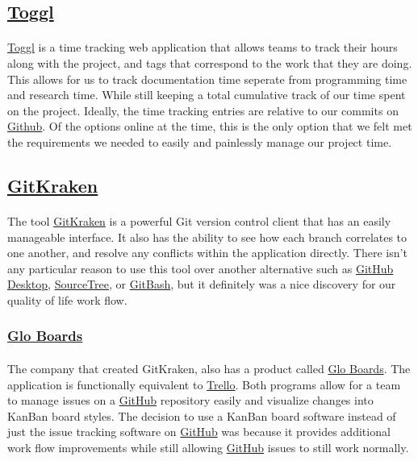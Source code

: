 \documentclass[12pt]{article}
\begin{document}
\subsection{\href{https://toggl.com}{Toggl}}
\paragraph{}	\href{https://toggl.com}{Toggl} is a time tracking web application that allows teams to track their hours along with the project, and tags that correspond to the work that they are doing. This allows for us to track documentation time seperate from programming time and research time. While still keeping a total cumulative track of our time spent on the project. Ideally, the time tracking entries are relative to our commits on \href{https://Github.com}{Github}. Of the options online at the time, this is the only option that we felt met the requirements we needed to easily and painlessly manage our project time.

\subsection{\href{https://www.gitkraken.com/}{GitKraken}}
\paragraph{}	The tool \href{https://www.gitkraken.com/}{GitKraken} is a powerful Git version control client that has an easily manageable interface. It also has the ability to see how each branch correlates to one another, and resolve any conflicts within the application directly. There isn't any particular reason to use this tool over another alternative such as \href{https://desktop.github.com/}{GitHub Desktop}, \href{https://www.sourcetreeapp.com/}{SourceTree}, or \href{https://gitforwindows.org/}{GitBash}, but it definitely was a nice discovery for our quality of life work flow. 

\subsubsection{\href{https://www.gitkraken.com/glo}{Glo Boards}}
\paragraph{} The company that created GitKraken, also has a product called \href{https://www.gitkraken.com/glo}{Glo Boards}. The application is functionally equivalent to \href{https://trello.com/en}{Trello}. Both programs allow for a team to manage issues on a \href{https://github.com}{GitHub} repository easily and visualize changes into KanBan board styles. The decision to use a KanBan board software instead of just the issue tracking software on \href{https://github.com}{GitHub} was because it provides additional work flow improvements while still allowing \href{https://github.com}{GitHub} issues to still work normally.
\end{document}
